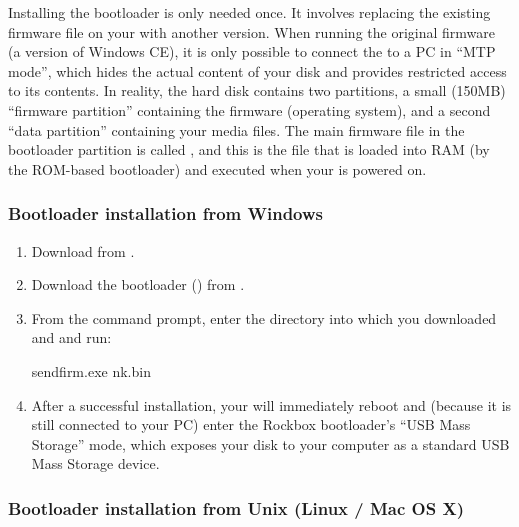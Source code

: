 

Installing the bootloader is only needed once. It involves replacing the
existing firmware file on your \dap{} with another version.
When running the original \playerman{} firmware (a version of Windows CE), it is
only possible to connect the \dap{} to a PC in ``MTP mode'', which hides
the actual content of your \daps{} disk and provides restricted access
to its contents.
In reality, the \daps{} hard disk contains two partitions, a small
(150MB) ``firmware partition'' containing the \daps{} firmware (operating
system), and a second ``data partition'' containing your media files. The main
firmware file in the bootloader partition is called , and
this is the file that is loaded into RAM (by the \daps{} ROM-based
bootloader) and executed when your \dap{} is powered on.

\subsubsection{Bootloader installation from Windows}

\begin{enumerate}
\item Download  from .
\item Download the bootloader () from .
\item From the command prompt, enter the directory into which you downloaded
 and  and run:
\begin{code} 
    sendfirm.exe nk.bin
\end{code}
\item After a successful installation, your \dap{} will immediately reboot
and (because it is still connected to your PC) enter the Rockbox bootloader's
``USB Mass Storage'' mode, which exposes your \daps{} disk to your computer
as a standard USB Mass Storage device.
\end{enumerate}

\subsubsection{Bootloader installation from Unix (Linux / Mac OS X)}

